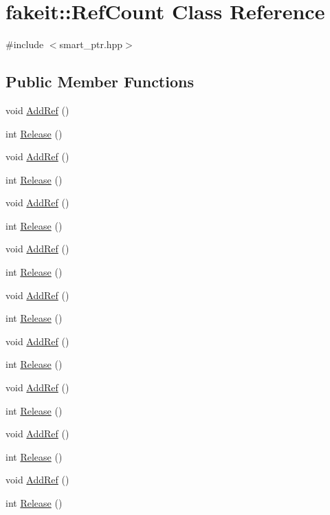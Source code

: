 \hypertarget{classfakeit_1_1RefCount}{}\section{fakeit\+::Ref\+Count Class Reference}
\label{classfakeit_1_1RefCount}


{\ttfamily \#include $<$smart\+\_\+ptr.\+hpp$>$}

\subsection*{Public Member Functions}
\begin{DoxyCompactItemize}
\item 
void \mbox{\hyperlink{classfakeit_1_1RefCount_a2e57428c28e3d2aba972f172a7b0a87d}{Add\+Ref}} ()
\item 
int \mbox{\hyperlink{classfakeit_1_1RefCount_a2e5ed9531fd9695ebec2ac2746828a58}{Release}} ()
\item 
void \mbox{\hyperlink{classfakeit_1_1RefCount_a2e57428c28e3d2aba972f172a7b0a87d}{Add\+Ref}} ()
\item 
int \mbox{\hyperlink{classfakeit_1_1RefCount_a2e5ed9531fd9695ebec2ac2746828a58}{Release}} ()
\item 
void \mbox{\hyperlink{classfakeit_1_1RefCount_a2e57428c28e3d2aba972f172a7b0a87d}{Add\+Ref}} ()
\item 
int \mbox{\hyperlink{classfakeit_1_1RefCount_a2e5ed9531fd9695ebec2ac2746828a58}{Release}} ()
\item 
void \mbox{\hyperlink{classfakeit_1_1RefCount_a2e57428c28e3d2aba972f172a7b0a87d}{Add\+Ref}} ()
\item 
int \mbox{\hyperlink{classfakeit_1_1RefCount_a2e5ed9531fd9695ebec2ac2746828a58}{Release}} ()
\item 
void \mbox{\hyperlink{classfakeit_1_1RefCount_a2e57428c28e3d2aba972f172a7b0a87d}{Add\+Ref}} ()
\item 
int \mbox{\hyperlink{classfakeit_1_1RefCount_a2e5ed9531fd9695ebec2ac2746828a58}{Release}} ()
\item 
void \mbox{\hyperlink{classfakeit_1_1RefCount_a2e57428c28e3d2aba972f172a7b0a87d}{Add\+Ref}} ()
\item 
int \mbox{\hyperlink{classfakeit_1_1RefCount_a2e5ed9531fd9695ebec2ac2746828a58}{Release}} ()
\item 
void \mbox{\hyperlink{classfakeit_1_1RefCount_a2e57428c28e3d2aba972f172a7b0a87d}{Add\+Ref}} ()
\item 
int \mbox{\hyperlink{classfakeit_1_1RefCount_a2e5ed9531fd9695ebec2ac2746828a58}{Release}} ()
\item 
void \mbox{\hyperlink{classfakeit_1_1RefCount_a2e57428c28e3d2aba972f172a7b0a87d}{Add\+Ref}} ()
\item 
int \mbox{\hyperlink{classfakeit_1_1RefCount_a2e5ed9531fd9695ebec2ac2746828a58}{Release}} ()
\item 
void \mbox{\hyperlink{classfakeit_1_1RefCount_a2e57428c28e3d2aba972f172a7b0a87d}{Add\+Ref}} ()
\item 
int \mbox{\hyperlink{classfakeit_1_1RefCount_a2e5ed9531fd9695ebec2ac2746828a58}{Release}} ()
\end{DoxyCompactItemize}


